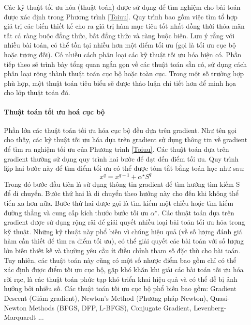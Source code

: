 \documentclass{thesis}
\begin{document}
Các kỹ thuật tối ưu hóa (thuật toán) được sử dụng để tìm nghiệm cho bài toán được xác định trong Phương trình \ref{Toiuu}. Quy trình bao gồm việc tìm tổ hợp giá trị các biến thiết kế cho ra giá trị hàm mục tiêu tốt nhất đồng thời thỏa mãn tất cả ràng buộc đẳng thức, bất đẳng thức và ràng buộc biên. Lưu ý rằng với nhiều bài toán, có thể tồn tại nhiều hơn một điểm tối ưu (gọi là tối ưu cục bộ hoặc tương đối). Có nhiều cách phân loại các kỹ thuật tối ưu hóa hiện có. Phần tiếp theo sẽ trình bày tổng quan ngắn gọn về các thuật toán sẵn có, sử dụng cách phân loại rộng thành thuật toán cục bộ hoặc toàn cục. Trong một số trường hợp phù hợp, một thuật toán tiêu biểu sẽ được thảo luận chi tiết hơn để minh họa cho lớp thuật toán đó.

\paragraph{Thuật toán tối ưu hoá cục bộ}\mbox


Phần lớn các thuật toán tối ưu hóa cục bộ đều dựa trên gradient. Như tên gọi cho thấy, các kỹ thuật tối ưu hóa dựa trên gradient sử dụng thông tin về gradient để tìm ra nghiệm tối ưu của Phương trình \ref{Toiuu}.
Các thuật toán dựa trên gradient thường sử dụng quy trình hai bước để đạt đến điểm tối ưu. 
Quy trình lặp hai bước này để tìm điểm tối ưu có thể được tóm tắt bằng toán học như sau: 
\begin{equation}
    x^q = x^{q-1} + \alpha^\star S^q  
\end{equation} 
Trong đó bước đầu tiên là sử dụng thông tin gradient để tìm hướng tìm kiếm S để di chuyển. Bước thứ hai là di chuyển theo hướng này cho đến khi không thể tiến xa hơn nữa. Bước thứ hai được gọi là tìm kiếm một chiều hoặc tìm kiếm đường thẳng và cung cấp kích thước bước tối ưu \( \alpha^\star \). 
 Các thuật toán dựa trên gradient được sử dụng rộng rãi để giải quyết nhiều loại bài toán tối ưu hóa trong kỹ thuật. Những kỹ thuật này phổ biến vì chúng hiệu quả (về số lượng đánh giá hàm cần thiết để tìm ra điểm tối ưu), có thể giải quyết các bài toán với số lượng lớn biến thiết kế và thường yêu cầu ít điều chỉnh tham số đặc thù cho bài toán. Tuy nhiên, các thuật toán này cũng có một số nhược điểm bao gồm chỉ có thể xác định được điểm tối ưu cục bộ, gặp khó khăn khi giải các bài toán tối ưu hóa rời rạc, là các thuật toán phức tạp khó triển khai hiệu quả và có thể dễ bị ảnh hưởng bởi nhiễu số. Các thuật toán tối ưu cục bộ phổ biến bao gồm: Gradient Descent (Giảm gradient), Newton's Method (Phương pháp Newton), Quasi-Newton Methods (BFGS, DFP, L-BFGS), Conjugate Gradient, Levenberg-Marquardt ...
\end{document}
